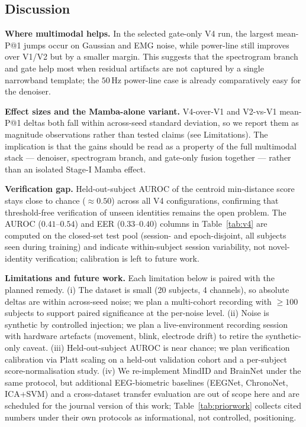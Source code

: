 \documentclass[conference,a4paper]{APSIPA2026}
\begin{document}
\subsection{Discussion}
\textbf{Where multimodal helps.} In the selected gate-only V4 run, the
largest mean-P@1 jumps occur on Gaussian and EMG noise, while power-line
still improves over V1/V2 but by a smaller margin. This suggests that
the spectrogram branch and gate help most when residual artifacts are
not captured by a single narrowband template; the $50$\,Hz power-line
case is already comparatively easy for the denoiser.

\textbf{Effect sizes and the Mamba-alone variant.} V4-over-V1 and
V2-vs-V1 mean-P@1 deltas both fall within across-seed standard
deviation, so we report them as magnitude observations rather than
tested claims (see Limitations). The implication is that the gains
should be read as a property of the full multimodal stack — denoiser,
spectrogram branch, and gate-only fusion together — rather than an
isolated Stage-I Mamba effect.

\textbf{Verification gap.} Held-out-subject AUROC of the centroid
min-distance score stays close to chance ($\approx 0.50$) across all
V4 configurations, confirming that threshold-free verification of
unseen identities remains the open problem. The AUROC ($0.41$--$0.54$)
and EER ($0.33$--$0.40$) columns in Table~\ref{tab:v4} are computed on
the closed-set test pool (session- and epoch-disjoint, all subjects
seen during training) and indicate within-subject session variability,
not novel-identity verification; calibration is left to future work.

\textbf{Limitations and future work.} Each limitation below is paired
with the planned remedy. (i) The dataset is small (20 subjects, 4
channels), so absolute deltas are within across-seed noise; we plan a
multi-cohort recording with $\geq 100$ subjects to support paired
significance at the per-noise level. (ii) Noise is synthetic by
controlled injection; we plan a live-environment recording session
with hardware artefacts (movement, blink, electrode drift) to retire
the synthetic-only caveat. (iii) Held-out-subject AUROC is near
chance; we plan verification calibration via Platt scaling on a
held-out validation cohort and a per-subject score-normalisation
study. (iv) We re-implement MindID and BrainNet under the same protocol,
but additional EEG-biometric baselines (EEGNet, ChronoNet, ICA+SVM) and
a cross-dataset transfer evaluation are out of scope here and are
scheduled for the journal version of this work; Table~\ref{tab:priorwork}
collects cited numbers under their own protocols as informational, not
controlled, positioning.
\end{document}
